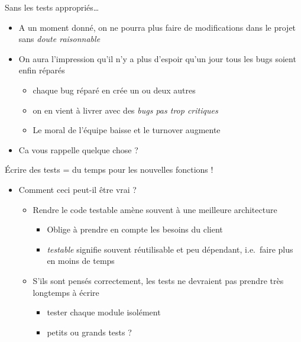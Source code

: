 \begin{frame}{Sans les tests appropriés\ldots{}}

\begin{itemize}
\itemsep1pt\parskip0pt
\item
  A un moment donné, on ne pourra plus faire de modifications dans le
  projet sans \emph{doute raisonnable}
\item
  On aura l'impression qu'il n'y a plus d'espoir qu'un jour tous les
  bugs soient enfin réparés

  \begin{itemize}
  \itemsep1pt\parskip0pt
  \item
    chaque bug réparé en crée un ou deux autres
  \item
    on en vient à livrer avec des \emph{bugs pas trop critiques}
  \item
    Le moral de l'équipe baisse et le turnover augmente
  \end{itemize}
\item
  Ca vous rappelle quelque chose ?
\end{itemize}

\end{frame}

\begin{frame}{Écrire des tests = du temps pour les nouvelles fonctions
!}

\begin{itemize}
\itemsep1pt\parskip0pt
\item
  Comment ceci peut-il être vrai ?

  \begin{itemize}
  \itemsep1pt\parskip0pt
  \item
    Rendre le code testable amène souvent à une meilleure architecture

    \begin{itemize}
    \itemsep1pt\parskip0pt
    \item
      Oblige à prendre en compte les besoins du client
    \item
      \emph{testable} signifie souvent réutilisable et peu dépendant,
      i.e.~faire plus en moins de temps
    \end{itemize}
  \item
    S'ils sont pensés correctement, les tests ne devraient pas prendre
    très longtemps à écrire

    \begin{itemize}
    \itemsep1pt\parskip0pt
    \item
      tester chaque module isolément
    \item
      petits ou grands tests ?
    \end{itemize}
  \end{itemize}
\end{itemize}

\end{frame}

